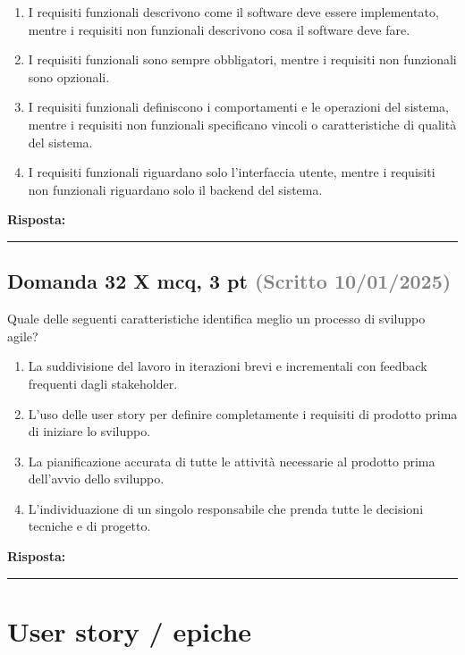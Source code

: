 \documentclass[a4paper,11pt]{article}
\begin{document}
\begin{enumerate}[label=\alph*)]
\item I requisiti funzionali descrivono come il software deve essere implementato, mentre i requisiti non funzionali descrivono cosa il software deve fare.
\item I requisiti funzionali sono sempre obbligatori, mentre i requisiti non funzionali sono opzionali.
\item I requisiti funzionali definiscono i comportamenti e le operazioni del sistema, mentre i requisiti non funzionali specificano vincoli o caratteristiche di qualità del sistema.
\item I requisiti funzionali riguardano solo l'interfaccia utente, mentre i requisiti non funzionali riguardano solo il backend del sistema.
\end{enumerate}
\vspace{0.2cm}
\noindent\textbf{Risposta:}\par
\vspace{1.5cm}\hrule


\subsection*{Domanda 32 X \hfill {\small mcq, 3 pt \textcolor{gray}{(Scritto 10/01/2025)}}}
Quale delle seguenti caratteristiche identifica meglio un processo di sviluppo agile?

\begin{enumerate}[label=\alph*)]
\item La suddivisione del lavoro in iterazioni brevi e incrementali con feedback frequenti dagli stakeholder.
\item L'uso delle user story per definire completamente i requisiti di prodotto prima di iniziare lo sviluppo.
\item La pianificazione accurata di tutte le attività necessarie al prodotto prima dell'avvio dello sviluppo.
\item L'individuazione di un singolo responsabile che prenda tutte le decisioni tecniche e di progetto.
\end{enumerate}
\vspace{0.2cm}
\noindent\textbf{Risposta:}\par
\vspace{1.5cm}\hrule


\section{User story / epiche}
\end{document}
